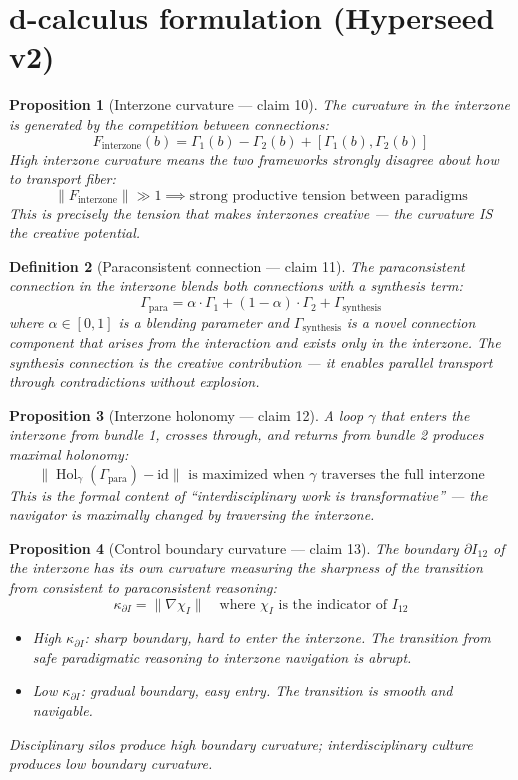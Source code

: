 \documentclass[11pt,a4paper]{article}
\newtheorem{definition}{Definition}[section]
\newtheorem{proposition}[definition]{Proposition}
\begin{document}
\section{d-calculus formulation (Hyperseed v2)}

\begin{proposition}[Interzone curvature --- claim 10]
\label{prop:curvature}
The curvature in the interzone is generated by the competition between
connections:
\[
  F_{\text{interzone}}(b) = \Gamma_1(b) - \Gamma_2(b) +
    [\Gamma_1(b), \Gamma_2(b)]
\]
High interzone curvature means the two frameworks strongly disagree
about how to transport fiber:
\[
  \|F_{\text{interzone}}\| \gg 1 \implies
  \text{strong productive tension between paradigms}
\]
This is precisely the tension that makes interzones creative --- the
curvature IS the creative potential.
\end{proposition}

\begin{definition}[Paraconsistent connection --- claim 11]
The \emph{paraconsistent connection} in the interzone blends both
connections with a synthesis term:
\[
  \Gamma_{\text{para}} = \alpha \cdot \Gamma_1 +
    (1 - \alpha) \cdot \Gamma_2 + \Gamma_{\text{synthesis}}
\]
where $\alpha \in [0,1]$ is a blending parameter and
$\Gamma_{\text{synthesis}}$ is a novel connection component that arises
from the interaction and exists only in the interzone. The synthesis
connection is the \emph{creative contribution} --- it enables parallel
transport through contradictions without explosion.
\end{definition}

\begin{proposition}[Interzone holonomy --- claim 12]
\label{prop:holonomy}
A loop $\gamma$ that enters the interzone from bundle 1, crosses
through, and returns from bundle 2 produces maximal holonomy:
\[
  \|\operatorname{Hol}_\gamma(\Gamma_{\text{para}}) - \mathrm{id}\|
  \text{ is maximized when } \gamma \text{ traverses the full interzone}
\]
This is the formal content of ``interdisciplinary work is transformative''
--- the navigator is maximally changed by traversing the interzone.
\end{proposition}

\begin{proposition}[Control boundary curvature --- claim 13]
\label{prop:boundary}
The boundary $\partial I_{12}$ of the interzone has its own curvature
measuring the sharpness of the transition from consistent to
paraconsistent reasoning:
\[
  \kappa_{\partial I} = \|\nabla \chi_I\| \quad
  \text{where } \chi_I \text{ is the indicator of } I_{12}
\]
\begin{itemize}
  \item High $\kappa_{\partial I}$: sharp boundary, hard to enter the
    interzone. The transition from safe paradigmatic reasoning to
    interzone navigation is abrupt.
  \item Low $\kappa_{\partial I}$: gradual boundary, easy entry. The
    transition is smooth and navigable.
\end{itemize}
Disciplinary silos produce high boundary curvature; interdisciplinary
culture produces low boundary curvature.
\end{proposition}
\end{document}
